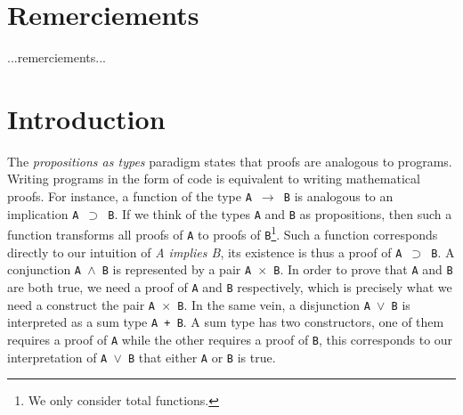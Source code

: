 \documentclass[12pt,twoside,maitrise]{dms}
\theoremstyle{definition}
\numberwithin{equation}{section}
\numberwithin{table}{chapter}
\numberwithin{figure}{chapter}
\newcommand\fn[1] {\texttt{#1}}
\begin{document}

\chapter*{Remerciements}

...remerciements...


\NoChapterPageNumber
\cleardoublepage
{}


\chapter{Introduction}

The \emph{propositions as types} paradigm states that proofs are analogous to
programs. Writing programs in the form of code is equivalent to writing
mathematical proofs. For instance, a function of the type \fn{A $\rightarrow$ B}
is analogous to an implication \fn{A $\supset$ B}. If we think of the types
\fn{A} and \fn{B} as propositions, then such a function transforms all proofs of
\fn{A} to proofs of \fn{B}\footnote{We only consider total functions.}. Such a
function corresponds directly to our intuition of \emph{A implies B}, its
existence is thus a proof of \fn{A $\supset$ B}. A conjunction \fn{A $\wedge$ B}
is represented by a pair \fn{A $\times$ B}. In order to prove that \fn{A} and
\fn{B} are both true, we need a proof of \fn{A} and \fn{B} respectively, which
is precisely what we need a construct the pair \fn{A $\times$ B}. In the same
vein, a disjunction \fn{A $\vee$ B} is interpreted as a sum type \fn{A + B}. A
sum type has two constructors, one of them requires a proof of \fn{A} while the
other requires a proof of \fn{B}, this corresponds to our interpretation of
\fn{A $\vee$ B} that either \fn{A} or \fn{B} is true.
\end{document}
